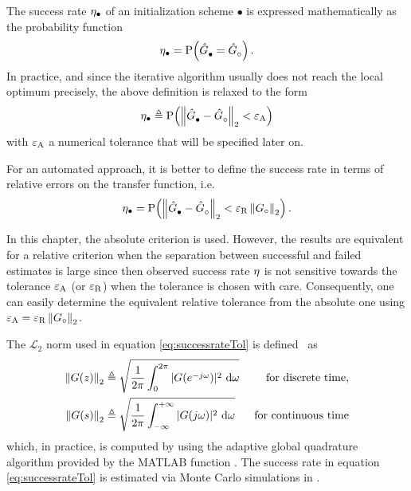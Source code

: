 The success rate $\successRate_{\bullet}$ of an initialization scheme $\bullet$ is expressed mathematically as the probability function
\begin{equation}
\successRate_{\bullet} = 
  \Prob{  \model{\bullet}=\model{\trueSymbol}  }
\text{.}
\end{equation}
In practice, and since the iterative algorithm usually does not reach the local optimum precisely, the above definition is relaxed to the form
\begin{equation}\label{eq:successrateTol}
\successRate_{\bullet} \isdef \Prob{ \norm[2]{\model{\bullet} - \model{\trueSymbol}} < \absoluteTolerance}
\end{equation}
with $\absoluteTolerance$ a numerical tolerance that will be specified later on.

\begin{remark}
For an automated approach, it is better to define the success rate in terms of relative errors on the transfer function, i.e.
\begin{equation}
\successRate_{\bullet} = \Prob{ \norm[2]{\model{\bullet}-\model{\trueSymbol}} < \relativeTolerance  \norm[2]{\true{G}}}
\text{.}
\end{equation}
\end{remark}
\begin{remark}
In this chapter, the absolute criterion is used.
However, the results are equivalent for a relative criterion when the separation between successful and failed estimates is large since then observed success rate $\successRate$ is not sensitive towards the tolerance $\absoluteTolerance$ (or $\relativeTolerance$) when the tolerance is chosen with care.
Consequently, one can easily determine the equivalent relative tolerance from the absolute one using $\absoluteTolerance = \relativeTolerance \norm[2]{\true{G}}$.
\end{remark}

The $\mathcal{L}_2$ norm used in equation \eqref{eq:successrateTol} is defined~\citep{Skogestad2005} as
\begin{align}
\norm[2]{G(z)} &\isdef \sqrt{\frac{1}{2\pi}\int_0^{2\pi} |G(e^{-j\omega})|^2\ \mathrm{d}\omega}& \text{ for discrete time,}\\
\norm[2]{G(s)} &\isdef \sqrt{\frac{1}{2\pi}\int_{-\infty}^{+\infty} |G(j\omega)|^2\ \mathrm{d}\omega}& \text{ for continuous time}
\end{align}
 which, in practice, is computed by using the adaptive global quadrature algorithm provided by the MATLAB function .
The success rate in equation \eqref{eq:successrateTol} is estimated via Monte Carlo simulations in .

